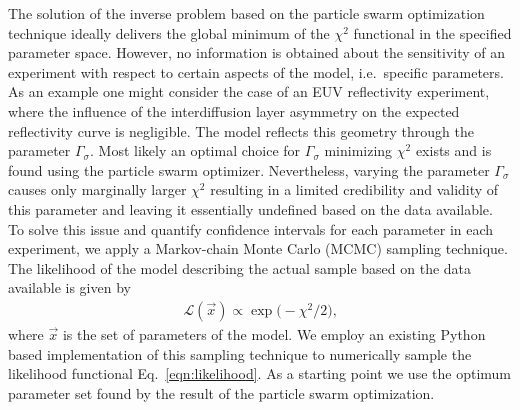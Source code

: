 The solution of the inverse problem based on the particle swarm optimization technique ideally delivers the global minimum of the $\chi^2$ functional in the specified parameter space. However, no information is obtained about the sensitivity of an experiment with respect to certain aspects of the model, i.e.~specific parameters. As an example one might consider the case of an EUV reflectivity experiment, where the influence of the interdiffusion layer asymmetry on the expected reflectivity curve is negligible. The model reflects this geometry through the parameter $\Gamma_\sigma$. Most likely an optimal choice for $\Gamma_\sigma$ minimizing $\chi^2$ exists and is found using the particle swarm optimizer. Nevertheless, varying the parameter $\Gamma_\sigma$ causes only marginally larger $\chi^2$ resulting in a limited credibility and validity of this parameter and leaving it essentially undefined based on the data available. To solve this issue and quantify confidence intervals for each parameter in each 
experiment, we apply a Markov-chain Monte Carlo (MCMC) sampling technique. The likelihood of the model describing the actual sample based on the data available is given by
\begin{align}
\mathcal{L}(\vec{x}) \propto \exp \big(-\chi^2 / 2 \big) \text{,} \label{eqn:likelihood}
\end{align}
where $\vec{x}$ is the set of parameters of the model.
We employ an existing Python based implementation of this sampling technique \cite{emcee} to numerically sample the likelihood functional Eq.~\eqref{eqn:likelihood}. As a starting point we use the optimum parameter set found by the result of the particle swarm optimization.

